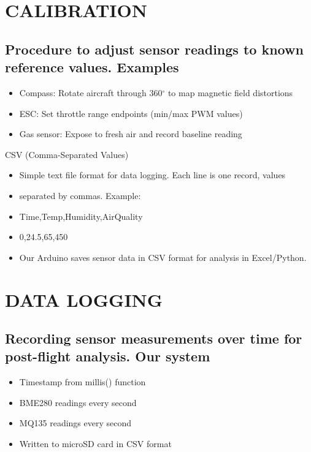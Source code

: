 \documentclass[11pt,letterpaper]{article}
\begin{document}
\section{CALIBRATION}

\subsection{Procedure to adjust sensor readings to known reference values. Examples}

\begin{itemize}
  \item Compass: Rotate aircraft through 360$^\circ$ to map magnetic field distortions
  \item ESC: Set throttle range endpoints (min/max PWM values)
  \item Gas sensor: Expose to fresh air and record baseline reading
\end{itemize}

CSV (Comma-Separated Values)\par

\begin{itemize}
  \item Simple text file format for data logging. Each line is one record, values
  \item separated by commas. Example:
  \item Time,Temp,Humidity,AirQuality
  \item 0,24.5,65,450
  \item Our Arduino saves sensor data in CSV format for analysis in Excel/Python.
\end{itemize}

\section{DATA LOGGING}

\subsection{Recording sensor measurements over time for post-flight analysis. Our system}

\begin{itemize}
  \item Timestamp from millis() function
  \item BME280 readings every second
  \item MQ135 readings every second
  \item Written to microSD card in CSV format
\end{itemize}
\end{document}
